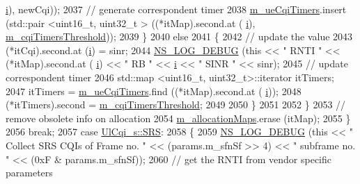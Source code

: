 \begin{DoxyCode}
      \hyperlink{bernuolliDistribution_8m_a6f6ccfcf58b31cb6412107d9d5281426}{i}), newCqi));
2037                 \textcolor{comment}{// generate correspondent timer}
2038                 \hyperlink{classns3_1_1PfFfMacScheduler_abe22b494875155dfe6a503734ad4bbad}{m\_ueCqiTimers}.insert (std::pair <uint16\_t, uint32\_t > ((*itMap).second.at (
      \hyperlink{bernuolliDistribution_8m_a6f6ccfcf58b31cb6412107d9d5281426}{i}), \hyperlink{classns3_1_1PfFfMacScheduler_ad2377e8bcc02252e2f0d3ca0fc2895b9}{m\_cqiTimersThreshold}));
2039               \}
2040             \textcolor{keywordflow}{else}
2041               \{
2042                 \textcolor{comment}{// update the value}
2043                 (*itCqi).second.at (\hyperlink{bernuolliDistribution_8m_a6f6ccfcf58b31cb6412107d9d5281426}{i}) = sinr;
2044                 \hyperlink{group__logging_ga413f1886406d49f59a6a0a89b77b4d0a}{NS\_LOG\_DEBUG} (\textcolor{keyword}{this} << \textcolor{stringliteral}{" RNTI "} << (*itMap).second.at (
      \hyperlink{bernuolliDistribution_8m_a6f6ccfcf58b31cb6412107d9d5281426}{i}) << \textcolor{stringliteral}{" RB "} << \hyperlink{bernuolliDistribution_8m_a6f6ccfcf58b31cb6412107d9d5281426}{i} << \textcolor{stringliteral}{" SINR "} << sinr);
2045                 \textcolor{comment}{// update correspondent timer}
2046                 std::map <uint16\_t, uint32\_t>::iterator itTimers;
2047                 itTimers = \hyperlink{classns3_1_1PfFfMacScheduler_abe22b494875155dfe6a503734ad4bbad}{m\_ueCqiTimers}.find ((*itMap).second.at (
      \hyperlink{bernuolliDistribution_8m_a6f6ccfcf58b31cb6412107d9d5281426}{i}));
2048                 (*itTimers).second = \hyperlink{classns3_1_1PfFfMacScheduler_ad2377e8bcc02252e2f0d3ca0fc2895b9}{m\_cqiTimersThreshold};
2049 
2050               \}
2051 
2052           \}
2053         \textcolor{comment}{// remove obsolete info on allocation}
2054         \hyperlink{classns3_1_1PfFfMacScheduler_a372b18540784762ebc10292caf8ca40f}{m\_allocationMaps}.erase (itMap);
2055       \}
2056       \textcolor{keywordflow}{break};
2057     \textcolor{keywordflow}{case} \hyperlink{structns3_1_1UlCqi__s_aece9e5ebea42eb9ff1744c72c8459b57af4b6dba4243636562c910c4d4761dd7e}{UlCqi\_s::SRS}:
2058       \{
2059          \hyperlink{group__logging_ga413f1886406d49f59a6a0a89b77b4d0a}{NS\_LOG\_DEBUG} (\textcolor{keyword}{this} << \textcolor{stringliteral}{" Collect SRS CQIs of Frame no. "} << (params.m\_sfnSf >> 4) << \textcolor{stringliteral}{"
       subframe no. "} << (0xF & params.m\_sfnSf));
2060         \textcolor{comment}{// get the RNTI from vendor specific parameters}

\end{DoxyCode}
